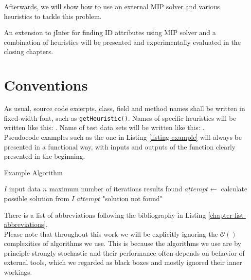 Afterwards, we will show how to use an external MIP solver and various heuristics to tackle this problem.

An extension to jInfer for finding ID attributes using MIP solver and a combination of heuristics will be presented and experimentally evaluated in the closing chapters.

\section{Conventions}

As usual, source code excerpts, class, field and method names shall be written in fixed-width font, such as \texttt{get\-Heu\-ris\-tic()}. Names of specific heuristics will be written like this: . Name of test data sets will be written like this: .\\

Pseudocode examples such as the one in Listing \ref{listing-example} will always be presented in a functional way, with inputs and outputs of the function clearly presented in the beginning.

\begin{algorithm}
\caption{Example Algorithm}
\label{listing-example}
\begin{algorithmic}
\REQUIRE $I$ input data
\REQUIRE $n$ maximum number of iterations
\ENSURE results found
  \STATE {}
  \STATE $attempt \gets $ calculate possible solution from $I$
    \RETURN $attempt$
  \ENDIF
  \RETURN "solution not found"
\ENDFOR
\end{algorithmic}
\end{algorithm}

There is a list of abbreviations following the bibliography in Listing \ref{chapter-list-abbreviations}.\\

Please note that throughout this work we will be explicitly ignoring the $\mathcal{O}()$ complexities of algorithms we use. This is because the algorithms we use are by principle strongly stochastic and their performance often depends on behavior of external tools, which we regarded as black boxes and mostly ignored their inner workings.